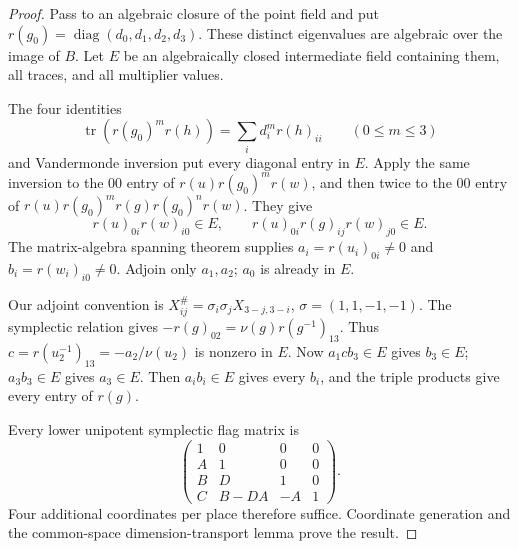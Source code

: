 \begin{proof}
Pass to an algebraic closure of the point field and put
\(r(g_0)=\operatorname{diag}(d_0,d_1,d_2,d_3)\).
These distinct eigenvalues are algebraic over the image of \(B\).
Let \(E\) be an algebraically closed intermediate field containing
them, all traces, and all multiplier values.

The four identities
\[
 \operatorname{tr}(r(g_0)^m r(h))
       =\sum_i d_i^m r(h)_{ii}\qquad(0\le m\le3)
\]
and Vandermonde inversion put every diagonal entry in \(E\).
Apply the same inversion to the \(00\) entry of
\(r(u)r(g_0)^m r(w)\), and then twice to the \(00\) entry of
\(r(u)r(g_0)^m r(g)r(g_0)^n r(w)\). They give
\begin{equation}\label{eq:sr-four-triples}
 r(u)_{0i}r(w)_{i0}\in E,\qquad
 r(u)_{0i}r(g)_{ij}r(w)_{j0}\in E .
\end{equation}
The matrix-algebra spanning theorem supplies
\(a_i=r(u_i)_{0i}\ne0\) and \(b_i=r(w_i)_{i0}\ne0\).
Adjoin only \(a_1,a_2\); \(a_0\) is already in \(E\).

Our adjoint convention is
\(X^\#_{ij}=\sigma_i\sigma_jX_{3-j,3-i}\),
\(\sigma=(1,1,-1,-1)\).
The symplectic relation gives
\(-r(g)_{02}=\nu(g)r(g^{-1})_{13}\).
Thus \(c=r(u_2^{-1})_{13}=-a_2/\nu(u_2)\) is nonzero in \(E\).
Now \(a_1cb_3\in E\) gives \(b_3\in E\);
\(a_3b_3\in E\) gives \(a_3\in E\).
Then \(a_ib_i\in E\) gives every \(b_i\), and the triple
products give every entry of \(r(g)\).

Every lower unipotent symplectic flag matrix is
\[
 \begin{pmatrix}
 1&0&0&0\\ A&1&0&0\\ B&D&1&0\\
 C&B-DA&-A&1
 \end{pmatrix}.
\]
Four additional coordinates per place therefore suffice.
Coordinate generation and the common-space dimension-transport
lemma prove the result.
\end{proof}

